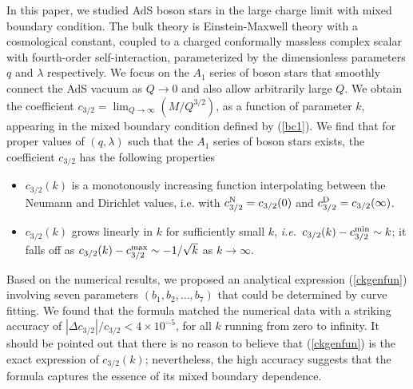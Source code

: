 \documentclass[11pt]{article}
\begin{document}
In this paper, we studied AdS boson stars in the large charge limit with mixed boundary condition. The bulk theory is Einstein-Maxwell theory with a cosmological constant, coupled to a charged conformally massless complex scalar with fourth-order self-interaction, parameterized by the dimensionless parameters $q$ and $\lambda$ respectively. We focus on the $A_1$ series of boson stars that smoothly connect the AdS vacuum as $Q\rightarrow 0$ and also allow arbitrarily large $Q$. We obtain the coefficient $c_{3/2} = \lim_{Q\rightarrow \infty} (M/Q^{3/2})$, as a function of  parameter $k$, appearing in the mixed boundary condition defined by (\ref{bc1}).  We find that for proper values of $(q,\lambda)$ such that  the $A_1$ series of boson stars exists, the coefficient $c_{3/2}$ has the following properties
\begin{itemize}

\item $c_{3/2}(k)$ is a monotonously increasing function interpolating between the Neumann and Dirichlet values, i.e. with $c_{3/2}^{\rm N}=c_{3/2}(0)$ and $c_{3/2}^{\rm D}=c_{3/2}(\infty)$.

\item $c_{3/2}(k)$ grows linearly in $k$ for sufficiently small $k$, {\it i.e.}~$c_{3/2}(k)-c_{3/2}^{\rm min}\sim k$; it falls off as $c_{3/2}(k)-c_{3/2}^{\rm max}\sim -1/\sqrt{k}$ as $k\rightarrow \infty$.


\end{itemize}
Based on the numerical results, we proposed an analytical expression (\ref{ckgenfun}) involving seven parameters $(b_1,b_2, \ldots, b_7)$ that could be determined by curve fitting.  We found that the formula matched the numerical data with a striking accuracy of $|\Delta c_{3/2}|/c_{3/2}<4\times 10^{-5}$, for all $k$ running from zero to infinity. It should be pointed out that there is no reason to believe that (\ref{ckgenfun}) is the exact expression of $c_{3/2}(k)$; nevertheless, the high accuracy suggests that the formula captures the essence of its mixed boundary dependence.
\end{document}
